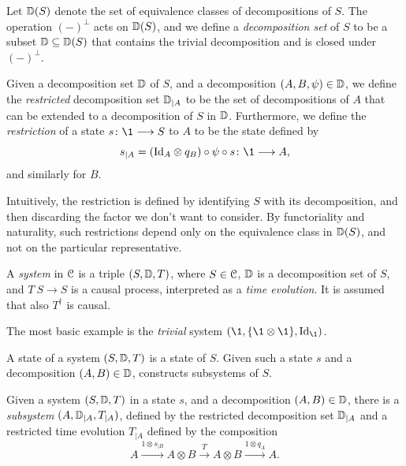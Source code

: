 \begin{definition}
    Let $\mathbb{D}(S)$ denote the set of equivalence classes of decompositions of $S$. The operation $(-)^\perp$ acts on $\mathbb{D}(S)$, and we define a \emph{decomposition set} of $S$ to be a subset $\mathbb{D} \subseteq \mathbb{D}(S)$ that contains the trivial decomposition and is closed under $(-)^\perp$. 
\end{definition}

\begin{definition}
    Given a decomposition set $\mathbb{D}$ of $S$, and a decomposition $(A, B, \psi)\in \mathbb{D}$, we define the \emph{restricted} decomposition set $\mathbb{D}_{\mid A}$ to be the set of decompositions of $A$ that can be extended to a decomposition of $S$ in $\mathbb{D}$. Furthermore, we define the \emph{restriction} of a state $s\: \1\to S$ to $A$ to be the state defined by 
    $$s_{\mid A} = (\Id_A\otimes q_{B})\circ \psi \circ s \: \1\to A,$$
    and similarly for $B$. 
\end{definition}

Intuitively, the restriction is defined by identifying $S$ with its decomposition, and then discarding the factor we don't want to consider. By functoriality and naturality, such restrictions depend only on the equivalence class in $\mathbb{D}(S)$, and not on the particular representative. 

\begin{definition}
    A \emph{system} in $\EuScript{C}$ is a triple $(S, \mathbb{D}, T)$, where $S\in \EuScript{C}$, $\mathbb{D}$ is a decomposition set of $S$, and $T\:S\to S$ is a causal process, interpreted as a \emph{time evolution}. It is assumed that also $T^\dagger$ is causal. 
\end{definition}

\begin{example}
    The most basic example is the \emph{trivial} system $(\1, \{\1\otimes \1\}, \Id_\1)$. 
\end{example}

A state of a system $(S, \mathbb{D}, T)$ is a state of $S$. Given such a state $s$ and a decomposition $(A, B)\in \mathbb{D}$, \citeme constructs subsystems of $S$. 

\begin{definition}
    Given a system $(S, \mathbb{D}, T)$ in a state $s$, and a decomposition $(A,B)\in \mathbb{D}$, there is a \emph{subsystem} $(A, \mathbb{D}_{\mid A}, T_{\mid A})$, defined by the restricted decomposition set $\mathbb{D}_{\mid A}$ and a restricted time evolution $T_{\mid A}$ defined by the composition
    \[A\overset{1\otimes s_{\mid B}}\to A\otimes B \overset{T}\to A\otimes B \overset{1\otimes q_{A}}\to A.\]
\end{definition}

